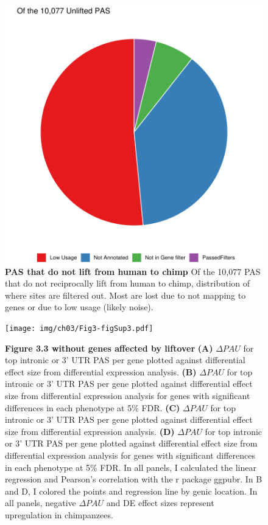 \begin{figure}[!htb]
\centering
\includegraphics[width=5in]{img/ch03/Fig2-figSup8.pdf}
\caption[PAS that do not lift from human to chimp]{\textbf{PAS that do not lift from human to chimp} Of the 10,077 PAS that do not reciprocally lift from human to chimp, distribution of where sites are filtered out. Most are lost due to not mapping to genes or due to low usage (likely noise). }
\label{fig:ch03-unlift}
\end{figure}
\clearpage

\begin{figure}[!htb]
\centering
\texttt{[image: img/ch03/Fig3-figSup3.pdf]}
\caption[Figure 3.3 without genes affected by liftover]{\textbf{Figure 3.3 without genes affected by liftover} {\bf (A)} $\Delta PAU$ for top intronic or 3' UTR PAS per gene plotted against differential effect size from differential expression analysis.  {\bf (B)}  $\Delta PAU$ for top intronic or 3' UTR PAS per gene plotted against differential effect size from differential expression analysis for genes with significant differences in each phenotype at 5\% FDR. {\bf (C)}  $\Delta PAU$ for top intronic or 3' UTR PAS per gene plotted against differential effect size from differential expression analysis. {\bf (D)}  $\Delta PAU$ for top intronic or 3' UTR PAS per gene plotted against differential effect size from differential expression analysis for genes with significant differences in each phenotype at 5\% FDR. In all panels, I calculated the linear regression and Pearson's correlation with the r package ggpubr. In B and D, I  colored the points and regression line by genic location. In all panels, negative $\Delta PAU$ and DE effect sizes represent upregulation in chimpanzees.}
\label{fig:ch03-unliftfig3}
\end{figure}
\clearpage


